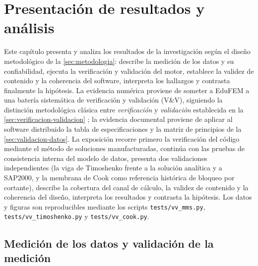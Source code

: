 \chapter{Presentación de resultados y análisis}
\label{cap:resultados}


Este capítulo presenta y analiza los resultados de la investigación según el diseño metodológico de la \autoref{sec:metodologia}: describe la medición de los datos y su confiabilidad, ejecuta la verificación y validación del motor, establece la validez de contenido y la coherencia del software, interpreta los hallazgos y contrasta finalmente la hipótesis. La evidencia numérica proviene de someter a EduFEM a una batería sistemática de verificación y validación (V\&V), siguiendo la distinción metodológica clásica entre \emph{verificación} y \emph{validación} establecida en la \autoref{sec:verificacion-validacion} \autocite[pp.~13-14]{oberkampf2010vv}; la evidencia documental proviene de aplicar al software distribuido la tabla de especificaciones y la matriz de principios de la \autoref{sec:validacion-datos}. La exposición recorre primero la verificación del código mediante el método de soluciones manufacturadas, continúa con las pruebas de consistencia interna del modelo de datos, presenta dos validaciones independientes (la viga de Timoshenko frente a la solución analítica y a SAP2000, y la membrana de Cook como referencia histórica de bloqueo por cortante), describe la cobertura del canal de cálculo, la validez de contenido y la coherencia del diseño, interpreta los resultados y contrasta la hipótesis. Los datos y figuras son reproducibles mediante los scripts \texttt{tests/vv\_mms.py}, \texttt{tests/vv\_timoshenko.py} y \texttt{tests/vv\_cook.py}.

\section{Medición de los datos y validación de la medición}
\label{sec:medicion}


